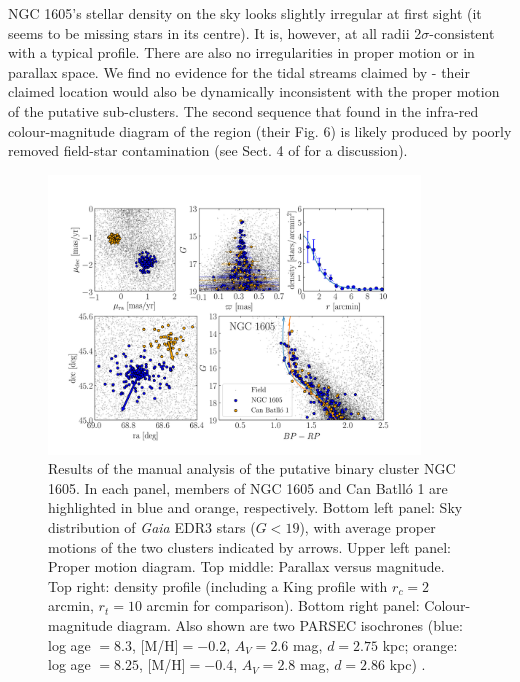 \documentclass[RNAAS]{aastex631}
\begin{document}
NGC 1605's stellar density on the sky looks slightly irregular at first sight (it seems to be missing stars in its centre). It is, however, at all radii 2$\sigma$-consistent with a typical \citet{King1962} profile. There are also no irregularities in proper motion or in parallax space. We find no evidence for the tidal streams claimed by \citet{Camargo2021} - their claimed location would also be dynamically inconsistent with the proper motion of the putative sub-clusters.
The second sequence that \citet{Camargo2021} found in the infra-red colour-magnitude diagram of the region (their Fig. 6) is likely produced by poorly removed field-star contamination (see Sect. 4 of \citealt{CantatAnders2020} for a discussion).

\begin{figure}
\begin{center}
\includegraphics[width=0.88\textwidth,angle=0]{./ngc1605_manual_analysis.png}
\caption{Results of the manual analysis of the putative binary cluster NGC 1605. In each panel, members of NGC 1605 and Can Batlló 1 are highlighted in blue and orange, respectively. Bottom left panel: Sky distribution of {\it Gaia} EDR3 stars ($G<19$), with average proper motions of the two clusters indicated by arrows. Upper left panel: Proper motion diagram. Top middle: Parallax versus magnitude. Top right: density profile (including a King profile with $r_c=2$ arcmin, $r_t=10$ arcmin for comparison). Bottom right panel: Colour-magnitude diagram. Also shown are two PARSEC isochrones (blue: log age $=8.3$, [M/H]$=-0.2$, $A_V=2.6$ mag, $d=2.75$ kpc; orange: log age $=8.25$, [M/H]$=-0.4$, $A_V=2.8$ mag, $d=2.86$ kpc) . 
\label{fig:1}}
\end{center}
\end{figure}
\end{document}
